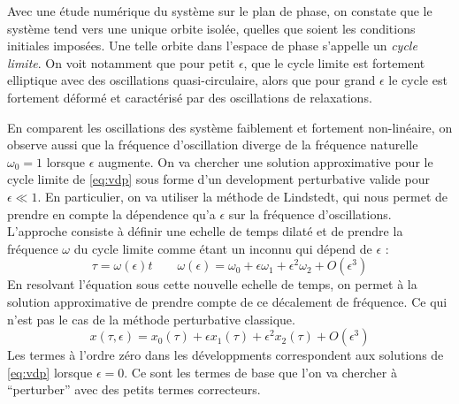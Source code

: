 Avec une étude numérique du système sur le plan de phase, on constate que le système tend vers une unique orbite isolée, quelles que soient les conditions initiales imposées. 
Une telle orbite dans l'espace de phase s'appelle un \emph{cycle limite}. On voit notamment que pour petit $\epsilon$, que le cycle limite est fortement elliptique avec des oscillations quasi-circulaire, 
alors que pour grand $\epsilon$ le cycle est fortement déformé et caractérisé par des oscillations de relaxations.

En comparent les oscillations des système faiblement et fortement non-linéaire, on observe aussi que la fréquence d'oscillation diverge de la fréquence naturelle $\omega_0 = 1$ lorsque $\epsilon$ augmente. 
On va chercher une solution approximative pour le cycle limite de \eqref{eq:vdp} sous forme d'un development perturbative valide pour $\epsilon \ll 1$. En particulier, on va utiliser la méthode de Lindstedt, 
qui nous permet de prendre en compte la dépendence qu'a $\epsilon$ sur la fréquence d'oscillations. L'approche consiste à définir une echelle de temps dilaté et de prendre la fréquence $\omega$ du cycle limite comme étant un inconnu qui dépend de $\epsilon$ :
\begin{equation}
    \tau = \omega(\epsilon)t
    \qquad
    \omega(\epsilon) = \omega_0 + \epsilon\omega_1 + \epsilon^2\omega_2 + O(\epsilon^3)
    \label{eq:omega_eps}
\end{equation}
En resolvant l'équation sous cette nouvelle echelle de temps, on permet à la solution approximative de prendre compte de ce décalement de fréquence.
Ce qui n'est pas le cas de la méthode perturbative classique.
\begin{equation}
    x(\tau, \epsilon) = x_0(\tau) + \epsilon x_1(\tau) + \epsilon^2 x_2(\tau) + O(\epsilon^3)
    \label{eq:x_eps}
\end{equation}
Les termes à l’ordre zéro dans les développments correspondent aux solutions de \eqref{eq:vdp} lorsque $\epsilon = 0$.
Ce sont les termes de base que l’on va chercher à ``perturber” avec des petits termes correcteurs.

